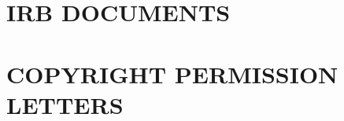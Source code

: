\documentclass{UCF_ETD}
\begin{document}

\appendix

\chapter{IRB DOCUMENTS}
\newpage



\chapter{COPYRIGHT PERMISSION LETTERS}
\newpage


\backmatter
\end{document}
